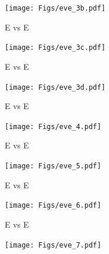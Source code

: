 \documentclass[12pt]{article}
\newcommand{\headsize}{\fontsize{35}{35} \selectfont}
\begin{document}
\vfill

\centerline{\texttt{[image: Figs/eve\_3b.pdf]}}


\newpage

\headsize \color{myyellow}
\hfill \begin{minipage}{5.75in}
\centering
E vs E
\end{minipage}

\vfill

\centerline{\texttt{[image: Figs/eve\_3c.pdf]}}


\newpage

\headsize \color{myyellow}
\hfill \begin{minipage}{5.75in}
\centering
E vs E
\end{minipage}

\vfill

\centerline{\texttt{[image: Figs/eve\_3d.pdf]}}


\newpage

\headsize \color{myyellow}
\hfill \begin{minipage}{5.75in}
\centering
E vs E
\end{minipage}

\vfill

\centerline{\texttt{[image: Figs/eve\_4.pdf]}}


\newpage

\headsize \color{myyellow}
\hfill \begin{minipage}{5.75in}
\centering
E vs E
\end{minipage}

\vfill

\centerline{\texttt{[image: Figs/eve\_5.pdf]}}



\newpage

\headsize \color{myyellow}
\hfill \begin{minipage}{5.75in}
\centering
E vs E
\end{minipage}

\vfill

\centerline{\texttt{[image: Figs/eve\_6.pdf]}}



\newpage

\headsize \color{myyellow}
\hfill \begin{minipage}{5.75in}
\centering
E vs E
\end{minipage}

\vfill

\centerline{\texttt{[image: Figs/eve\_7.pdf]}}
\end{document}
